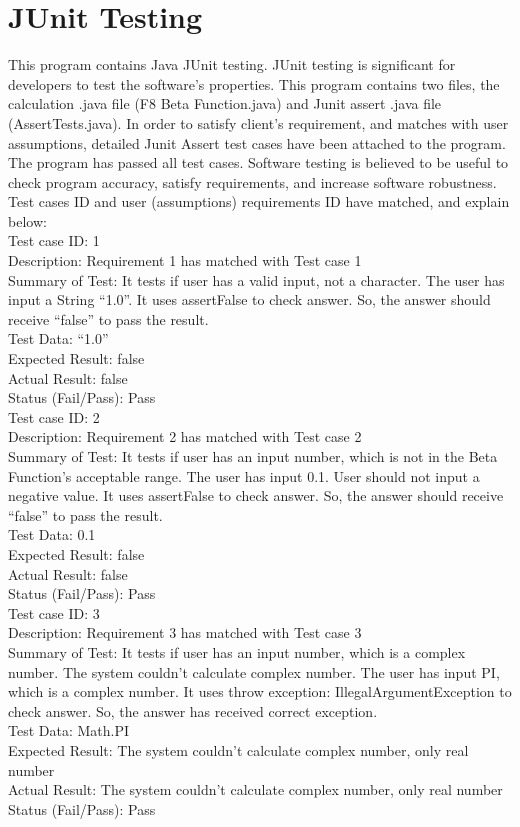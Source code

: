 \documentclass{article}
\begin{document}
\section{JUnit Testing}

This program contains Java JUnit testing. JUnit testing is significant for developers to test the software's properties. This program contains two files, the calculation .java file (F8 Beta Function.java) and Junit assert .java file (AssertTests.java). In order to satisfy client's requirement, and matches with user assumptions, detailed Junit Assert test cases have been attached to the program. The program has passed all test cases. Software testing is believed to be useful to check program accuracy, satisfy requirements, and increase software robustness.
Test cases ID and user (assumptions) requirements ID have matched, and explain below: \\

Test case ID: 1 \\
Description: Requirement 1 has matched with Test case 1 \\
Summary of Test: It tests if user has a valid input, not a character. The user has input a String “1.0”.  It uses assertFalse to check answer. So, the answer should receive “false” to pass the result. \\
Test Data: “1.0” \\
Expected Result: false \\
Actual Result: false \\
Status (Fail/Pass): Pass \\


Test case ID: 2 \\
Description: Requirement 2 has matched with Test case 2 \\
Summary of Test: It tests if user has an input number, which is not in the Beta Function's acceptable range. The user has input 0.1. User should not input a negative value. It uses assertFalse to check answer. So, the answer should receive “false” to pass the result. \\
Test Data: 0.1 \\
Expected Result: false \\
Actual Result: false \\
Status (Fail/Pass): Pass \\


Test case ID: 3 \\
Description: Requirement 3 has matched with Test case 3 \\
Summary of Test: It tests if user has an input number, which is a complex number. The system couldn't calculate complex number. The user has input PI, which is a complex number. It uses throw exception: IllegalArgumentException to check answer. So, the answer has received correct exception. \\
Test Data: Math.PI \\
Expected Result: The system couldn't calculate complex number, only real number \\
Actual Result: The system couldn't calculate complex number, only real number \\
Status (Fail/Pass): Pass \\
\end{document}
